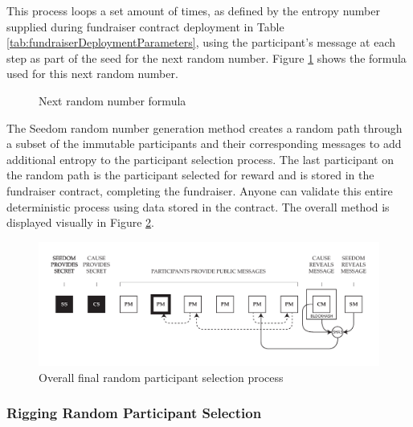 \documentclass[11pt]{article}
\begin{document}
This process loops a set amount of times, as defined by the entropy number supplied during fundraiser contract deployment in Table \ref{tab:fundraiserDeploymentParameters}, using the participant's message at each step as part of the seed for the next random number. Figure \ref{figure:nextRandomNumberFormula} shows the formula used for this next random number.

\begin{figure}[H]
\begin{center}
\caption{Next random number formula}
\label{figure:nextRandomNumberFormula}
\end{center}
\end{figure}

The Seedom random number generation method creates a random path through a subset of the immutable participants and their corresponding messages to add additional entropy to the participant selection process. The last participant on the random path is the participant selected for reward and is stored in the fundraiser contract, completing the fundraiser. Anyone can validate this entire deterministic process using data stored in the contract. The overall method is displayed visually in Figure \ref{figure:overallFinalRandomParticipantSelectionProcess}.

\begin{figure}[H]
\begin{center}
\includegraphics[width=1.0\textwidth]{./graphics/final-random-participant-selection.pdf}
\caption{Overall final random participant selection process}
\label{figure:overallFinalRandomParticipantSelectionProcess}
\end{center}
\end{figure}

\subsubsection{Rigging Random Participant Selection}
\end{document}

